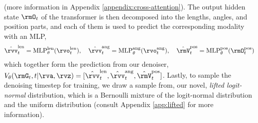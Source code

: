 \documentclass{article}
\theoremstyle{plain}
\theoremstyle{definition}
\theoremstyle{remark}
\begin{document}
(more information in Appendix \ref{appendix:cross-attention}).
The output hidden state $\rmO_{t}$ of the transformer is then decomposed into the lengths, angles, and position parts, and each of them is used to predict the corresponding modality with an MLP,
\begin{align}
    \hat{\rvv}^{\text{len}}_{t} = \operatorname{MLP}^{\text{len}}_{\theta}(\rvo^{\text{len}}_{t}), \quad 
    \hat{\rvv}^{\text{ang}}_{t} = \operatorname{MLP}^{\text{ang}}_{\theta}(\rvo^{\text{ang}}_{t}), \quad 
    \hat{\rmV}^{\text{pos}}_{t} = \operatorname{MLP}^{\text{pos}}_{\theta}(\rmO^{\text{pos}}_{t})\nonumber
\end{align}
which together form the prediction from our denoiser, $V_{\theta}(\rmG_{t}, t | \rva, \rvz) = [\hat{\rvv}^{\text{len}}_{t}, \hat{\rvv}^{\text{ang}}_{t}, \hat{\rmV}^{\text{pos}}_{t}]$. 
Lastly, to sample the denoising timestep for training, we draw a sample from, our novel, \textit{lifted logit-normal} distribution, which is a Bernoulli mixture of the logit-normal distribution and the uniform distribution (consult Appendix \ref{app:lifted} for more information). 


\vspace{-5pt}
\end{document}
